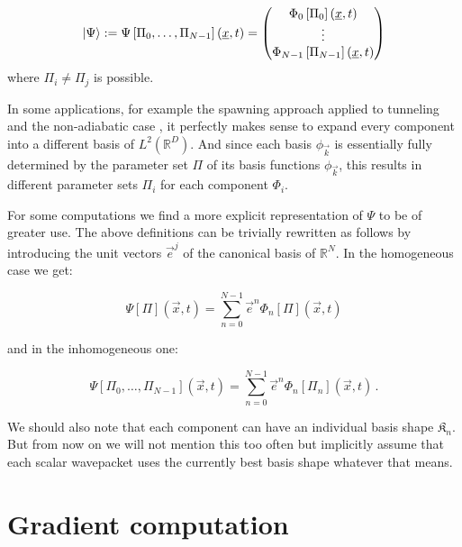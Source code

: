 \begin{definition}
  \begin{equation} \label{eq:vectorial_wavepacket_inhom}
    \Ket{\Psi} :=
    \Psi\left[\Pi_0, \ldots, \Pi_{N-1}\right](\underline{x}, t)
    =
    \begin{pmatrix}
      \Phi_0\left[\Pi_0\right](\underline{x}, t) \\
      \vdots \\
      \Phi_{N-1}\left[\Pi_{N-1}\right](\underline{x}, t) \\
    \end{pmatrix}
  \end{equation}
  where $\Pi_i \neq \Pi_j$ is possible.
\end{definition}

In some applications, for example the spawning approach applied to tunneling
\cite{Gradinaru_semiclassical_tunneling} and the non-adiabatic case
\cite{B_spawning_thesis}, it perfectly makes sense to expand every component
into a different basis of $L^2\left(\mathbb{R}^D\right)$. And since each basis
$\phi_{\vec{k}}$ is essentially fully determined by the parameter set $\Pi$ of
its basis functions $\phi_{\vec{k}}$, this results in different parameter sets
$\Pi_i$ for each component $\Phi_i$.

For some computations we find a more explicit representation of $\Psi$ to be
of greater use. The above definitions can be trivially rewritten as follows by
introducing the unit vectors $\vec{e}^j$ of the canonical basis of $\mathbb{R}^N$.
In the homogeneous case we get:

\begin{equation}
  \Psi\left[\Pi\right](\vec{x}, t) = \sum_{n=0}^{N-1} \vec{e}^n \Phi_n\left[\Pi\right](\vec{x}, t)
\end{equation}

and in the inhomogeneous one:

\begin{equation}
  \Psi\left[\Pi_0,\ldots,\Pi_{N-1}\right](\vec{x}, t) = \sum_{n=0}^{N-1} \vec{e}^n \Phi_n\left[\Pi_n\right](\vec{x}, t) \,.
\end{equation}

We should also note that each component can have an individual basis shape $\mathfrak{K}_n$.
But from now on we will not mention this too often but implicitly assume that each
scalar wavepacket uses the currently best basis shape whatever that means.


\section{Gradient computation}
\label{sec:gradient_computation}


